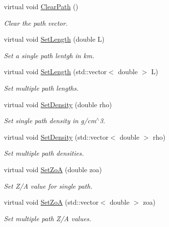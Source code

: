 \begin{DoxyCompactItemize}
virtual void \hyperlink{classOscProb_1_1PMNS__Base_aefe521239031c418cfaaaa550a6e13bb}{Clear\+Path} ()
\begin{DoxyCompactList}\small\item\em Clear the path vector. \end{DoxyCompactList}\item 
virtual void \hyperlink{classOscProb_1_1PMNS__Base_a6241325b1bd28cafa556daaecbe4ed62}{Set\+Length} (double L)
\begin{DoxyCompactList}\small\item\em Set a single path lentgh in km. \end{DoxyCompactList}\item 
virtual void \hyperlink{classOscProb_1_1PMNS__Base_aa34a40a3b5abda0f252982d9ead3b520}{Set\+Length} (std\+::vector$<$ double $>$ L)
\begin{DoxyCompactList}\small\item\em Set multiple path lengths. \end{DoxyCompactList}\item 
virtual void \hyperlink{classOscProb_1_1PMNS__Base_ac74206f349687da141392c81e2ba6b0d}{Set\+Density} (double rho)
\begin{DoxyCompactList}\small\item\em Set single path density in g/cm$^\wedge$3. \end{DoxyCompactList}\item 
virtual void \hyperlink{classOscProb_1_1PMNS__Base_a858221d5510fe732dc6a101fd305cda0}{Set\+Density} (std\+::vector$<$ double $>$ rho)
\begin{DoxyCompactList}\small\item\em Set multiple path densities. \end{DoxyCompactList}\item 
virtual void \hyperlink{classOscProb_1_1PMNS__Base_a1bf3ea8fd2507fd2fd82d7410ff8f578}{Set\+ZoA} (double zoa)
\begin{DoxyCompactList}\small\item\em Set Z/A value for single path. \end{DoxyCompactList}\item 
virtual void \hyperlink{classOscProb_1_1PMNS__Base_a8495f8a320e1a21965e6a64aec92ad2a}{Set\+ZoA} (std\+::vector$<$ double $>$ zoa)
\begin{DoxyCompactList}\small\item\em Set multiple path Z/A values. \end{DoxyCompactList}\item 

\end{DoxyCompactItemize}
